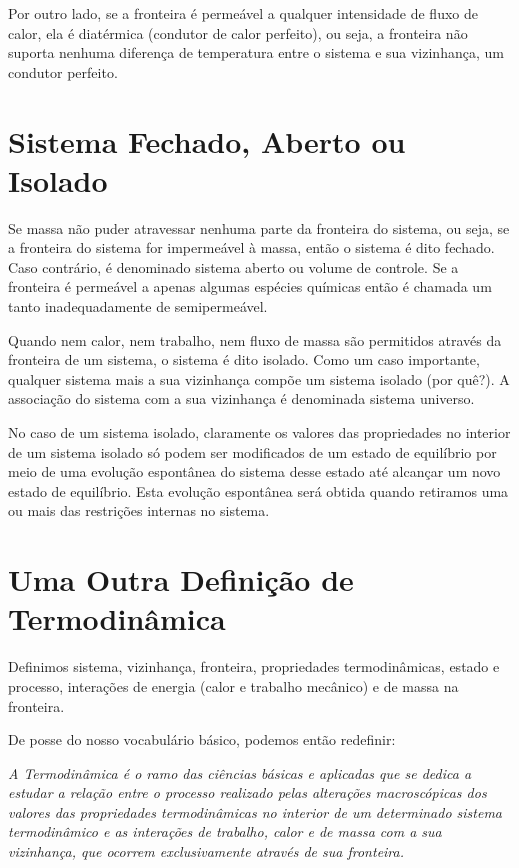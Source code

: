     Por outro lado, se a fronteira é permeável a qualquer intensidade de fluxo
    de calor, ela é diatérmica (condutor de calor perfeito), ou seja, a
    fronteira não suporta nenhuma diferença de temperatura entre o sistema e
    sua vizinhança, um condutor perfeito.


    \section{Sistema Fechado, Aberto ou Isolado}

    Se massa não puder atravessar nenhuma parte da fronteira do sistema, ou
    seja, se a fronteira do sistema for impermeável à massa, então o sistema é
    dito fechado. Caso contrário, é denominado sistema aberto ou volume de
    controle. Se a fronteira é permeável a apenas algumas espécies químicas
    então é chamada um tanto inadequadamente de semipermeável.

    Quando nem calor, nem trabalho, nem fluxo de massa são permitidos através
    da fronteira de um sistema, o sistema é dito isolado. Como um caso
    importante, qualquer sistema mais a sua vizinhança compõe um sistema
    isolado (por quê?). A associação do sistema com a sua vizinhança é
    denominada sistema universo.

    No caso de um sistema isolado, claramente os valores das propriedades no
    interior de um sistema isolado só podem ser modificados de um estado de
    equilíbrio por meio de uma evolução espontânea do sistema desse estado até
    alcançar um novo estado de equilíbrio. Esta evolução espontânea será obtida
    quando retiramos uma ou mais das restrições internas no sistema.


    \section{Uma Outra Definição de Termodinâmica}

    Definimos sistema, vizinhança, fronteira, propriedades termodinâmicas,
    estado e processo, interações de energia (calor e trabalho mecânico) e de
    massa na fronteira.

    De posse do nosso vocabulário básico, podemos então redefinir:

    \emph{%
        A Termodinâmica é o ramo das ciências básicas e aplicadas que se dedica
        a estudar a relação entre o processo realizado pelas alterações
        macroscópicas dos valores das propriedades termodinâmicas no interior
        de um determinado sistema termodinâmico e as interações de trabalho,
        calor e de massa com a sua vizinhança, que ocorrem exclusivamente
        através de sua fronteira.%
    }

